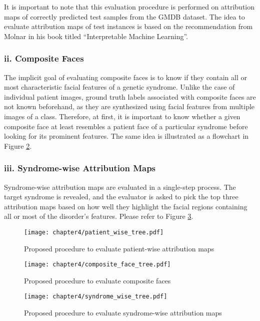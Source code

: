 \documentclass[../report.tex]{subfiles}
\begin{document}
    It is important to note that this evaluation procedure is performed on attribution maps of correctly predicted test samples from the GMDB dataset. The idea to evaluate attribution maps of test instances is based on the recommendation from Molnar in his book titled \enquote{Interpretable Machine Learning}\cite{molnar2019}.
    
    \subsubsection{ii. Composite Faces}
    \raggedbottom
    The implicit goal of evaluating composite faces is to know if they contain all or most characteristic facial features of a genetic syndrome. Unlike the case of individual patient images, ground truth labels associated with composite faces are not known beforehand, as they are synthesized using facial features from multiple images of a class. Therefore, at first, it is important to know whether a given composite face at least resembles a patient face of a particular syndrome before looking for its prominent features. The same idea is illustrated as a flowchart in Figure \ref{fig_composite_flow1}. 

	\subsubsection{iii. Syndrome-wise Attribution Maps}
	Syndrome-wise attribution maps are evaluated in a single-step process. The target syndrome is revealed, and the evaluator is asked to pick the top three attribution maps based on how well they highlight the facial regions containing all or most of the disorder's features. Please refer to Figure \ref{fig_synd_flow}.
    
     \begin{figure}[H]
     	\hspace*{1cm}    
    	\texttt{[image: chapter4/patient\_wise\_tree.pdf]}
    	\vspace*{1cm}
   	    \caption{Proposed procedure to evaluate patient-wise attribution maps}
		\label{fig_patient_flow}
    \end{figure}
	
	\begin{figure}[H]
		\hspace*{1cm}      
		\texttt{[image: chapter4/composite\_face\_tree.pdf]}
		\vspace*{4cm}
		\caption{Proposed procedure to evaluate composite faces}
		\label{fig_composite_flow1}	
	\end{figure}

	\begin{figure}[H]
		\hspace*{4.5cm}      
		\texttt{[image: chapter4/syndrome\_wise\_tree.pdf]}
		\caption[Proposed procedure to evaluate syndrome-wise attribution maps]{Proposed procedure to evaluate syndrome-wise attribution maps}
		\label{fig_synd_flow}	
	\end{figure}
\end{document}
